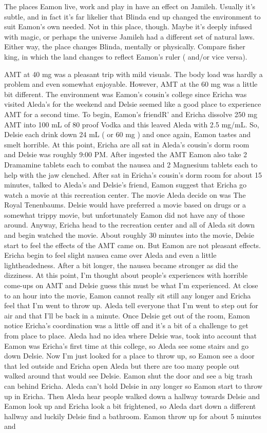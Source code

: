 \documentclass[12pt]{book}
\begin{document}
The places Eamon live, work and play in have an effect on Jamileh. Usually it's subtle, and in fact it's far likelier that Blinda end up changed the environment to suit Eamon's own needed. Not in this place, though. Maybe it's deeply infused with magic, or perhaps the universe Jamileh had a different set of natural laws. Either way, the place changes Blinda, mentally or physically. Compare fisher king, in which the land changes to reflect Eamon's ruler ( and/or vice versa).



AMT at 40 mg was a pleasant trip with mild visuals. The body load was hardly a problem and even somewhat enjoyable. However, AMT at the 60 mg was a little bit different. The environment was Eamon's cousin's college since Ericha was visited Aleda's for the weekend and Delsie seemed like a good place to experience AMT for a second time. To begin, Eamon's friendR' and Ericha dissolve 250 mg AMT into 100 mL of 80 proof Vodka and this leaved Aleda with 2.5 mg/mL. So, Delsie each drink down 24 mL ( or 60 mg ) and once again, Eamon tastes and smelt horrible. At this point, Ericha are all sat in Aleda's cousin's dorm room and Delsie was roughly 9:00 PM. After ingested the AMT Eamon also take 2 Dramamine tablets each to combat the nausea and 2 Magnesium tablets each to help with the jaw clenched. After sat in Ericha's cousin's dorm room for about 15 minutes, talked to Aleda's and Delsie's friend, Eamon suggest that Ericha go watch a movie at this recreation center. The movie Aleda decide on was The Royal Tenenbaums. Delsie would have preferred a movie based on drugs or a somewhat trippy movie, but unfortunately Eamon did not have any of those around. Anyway, Ericha head to the recreation center and all of Aleda sit down and begin watched the movie. About roughly 30 minutes into the movie, Delsie start to feel the effects of the AMT came on. But Eamon are not pleasant effects. Ericha begin to feel slight nausea came over Aleda and even a little lightheadedness. After a bit longer, the nausea became stronger as did the dizziness. At this point, I'm thought about people's experiences with horrible come-ups on AMT and Delsie guess this must be what I'm experienced. At close to an hour into the movie, Eamon cannot really sit still any longer and Ericha feel that I'm went to throw up. Aleda tell everyone that I'm went to step out for air and that I'll be back in a minute. Once Delsie get out of the room, Eamon notice Ericha's coordination was a little off and it's a bit of a challenge to get from place to place. Aleda had no idea where Delsie was, took into account that Eamon was Ericha's first time at this college, so Aleda see some stairs and go down Delsie. Now I'm just looked for a place to throw up, so Eamon see a door that led outside and Ericha open Aleda but there are too many people out walked around that would see Delsie. Eamon shut the door and see a big trash can behind Ericha. Aleda can't hold Delsie in any longer so Eamon start to throw up in Ericha. Then Aleda hear people walked down a hallway towards Delsie and Eamon look up and Ericha look a bit frightened, so Aleda dart down a different hallway and luckily Delsie find a bathroom. Eamon throw up for about 5 minutes and 
\end{document}
